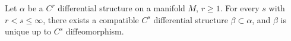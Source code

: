 Let $\alpha$ be a $C^r$ differential structure on a manifold $M$, $r \geqslant 1$. For every $s$ with $r < s \leqslant \infty$, there exists a compatible $C^s$ differential structure $\beta \subset \alpha$, and $\beta$ is unique up to $C^s$ diffeomorphism.

